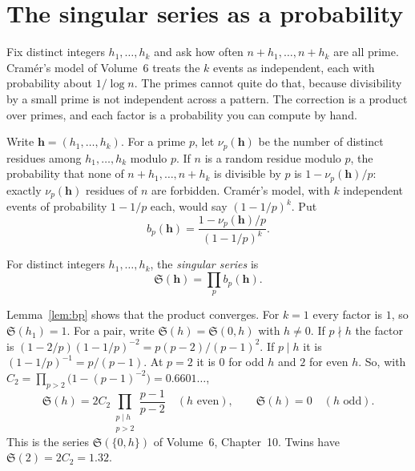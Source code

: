 \section{The singular series as a probability}

Fix distinct integers $h_1,\dots,h_k$ and ask how often $n+h_1,\dots,n+h_k$ are all prime. Cram\'er's model of Volume~6 treats the $k$ events as independent, each with probability about $1/\log n$. The primes cannot quite do that, because divisibility by a small prime is not independent across a pattern. The correction is a product over primes, and each factor is a probability you can compute by hand.

Write $\mathbf h=(h_1,\dots,h_k)$. For a prime $p$, let $\nu_p(\mathbf h)$ be the number of distinct residues among $h_1,\dots,h_k$ modulo $p$. If $n$ is a random residue modulo $p$, the probability that none of $n+h_1,\dots,n+h_k$ is divisible by $p$ is $1-\nu_p(\mathbf h)/p$: exactly $\nu_p(\mathbf h)$ residues of $n$ are forbidden. Cram\'er's model, with $k$ independent events of probability $1-1/p$ each, would say $(1-1/p)^k$. Put
\[
b_p(\mathbf h)=\frac{1-\nu_p(\mathbf h)/p}{(1-1/p)^k}.
\]

\begin{definition}\label{def:singular}
For distinct integers $h_1,\dots,h_k$, the \emph{singular series} is
\[
\mathfrak S(\mathbf h)=\prod_p b_p(\mathbf h).
\]
\end{definition}

Lemma~\ref{lem:bp} shows that the product converges. For $k=1$ every factor is $1$, so $\mathfrak S(h_1)=1$. For a pair, write $\mathfrak S(h)=\mathfrak S(0,h)$ with $h\ne0$. If $p\nmid h$ the factor is $(1-2/p)(1-1/p)^{-2}=p(p-2)/(p-1)^2$. If $p\mid h$ it is $(1-1/p)^{-1}=p/(p-1)$. At $p=2$ it is $0$ for odd $h$ and $2$ for even $h$. So, with $C_2=\prod_{p>2}\bigl(1-(p-1)^{-2}\bigr)=0.6601\ldots$,
\begin{equation}\label{eq:pairseries}
\mathfrak S(h)=2C_2\prod_{\substack{p\mid h\\p>2}}\frac{p-1}{p-2}\quad(h\text{ even}),\qquad\mathfrak S(h)=0\quad(h\text{ odd}).
\end{equation}
This is the series $\mathfrak S(\{0,h\})$ of Volume~6, Chapter~10. Twins have $\mathfrak S(2)=2C_2=1.32$.

